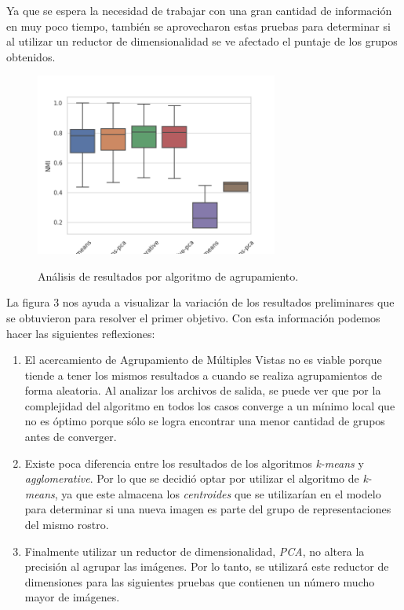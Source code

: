 \documentclass[letterpaper, 10 pt, conference]{ieeeconf}  %
\begin{document}
    Ya que se espera la necesidad de trabajar con una gran cantidad de información en muy poco
    tiempo, también se aprovecharon estas pruebas para determinar si al utilizar un reductor de
    dimensionalidad se ve afectado el puntaje de los grupos obtenidos.

    \begin{figure}[ht]
        \centering
        \includegraphics[width=8cm]{./figs/cluster_comparison.png}
        \label{fig: Results Cluster}
        \caption{Análisis de resultados por algoritmo de agrupamiento.}
    \end{figure}

    La figura 3 nos ayuda a visualizar la variación de los resultados preliminares que se
    obtuvieron para resolver el primer objetivo. Con esta información podemos hacer
    las siguientes reflexiones:

    \begin{enumerate}
        \item El acercamiento de Agrupamiento de Múltiples Vistas no es viable porque tiende a
            tener los mismos resultados a cuando se realiza agrupamientos de forma aleatoria.
            Al analizar los archivos de salida, se puede ver que por la complejidad del algoritmo
            en todos los casos converge a un mínimo local que no es óptimo porque sólo se logra
            encontrar una menor cantidad de grupos antes de converger.
        \item Existe poca diferencia entre los resultados de los algoritmos \textit{k-means} y
            \textit{agglomerative}. Por lo que se decidió optar por utilizar el algoritmo de
            \textit{k-means}, ya que este almacena los \textit{centroides} que se utilizarían
            en el modelo para determinar si una nueva imagen es parte del grupo de representaciones
            del mismo rostro.
        \item Finalmente utilizar un reductor de dimensionalidad, \textit{PCA}, no
            altera la precisión al agrupar las imágenes. Por lo tanto, se utilizará este reductor
            de dimensiones para las siguientes pruebas que contienen un número mucho mayor de
            imágenes.
    \end{enumerate}
\end{document}
